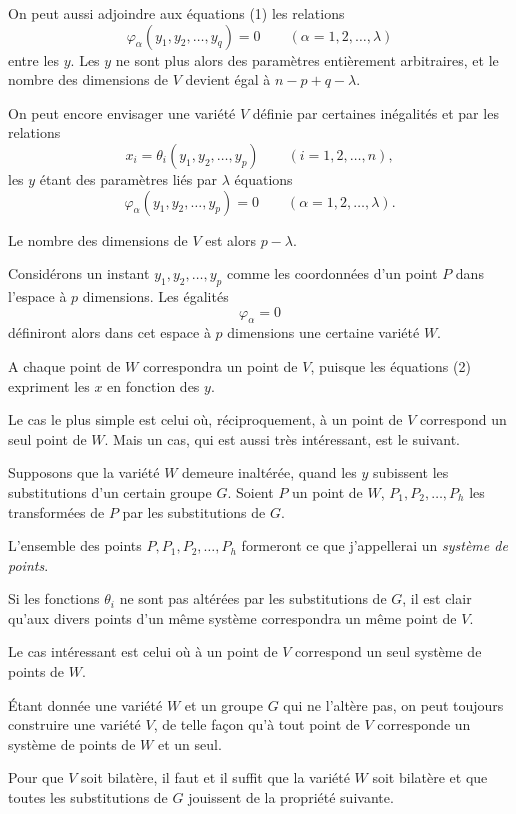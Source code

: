 \documentclass{article}
\begin{document}
On peut aussi adjoindre aux équations (1) les relations
\[ \varphi_{\alpha}(y_{1}, y_{2}, \ldots, y_{q}) = 0 \qquad (\alpha = 1, 2, \ldots, \lambda) \]
entre les $y$. Les $y$ ne sont plus alors des paramètres entièrement arbitraires, et le nombre des dimensions de $V$ devient égal à $n - p + q - \lambda$.

On peut encore envisager une variété $V$ définie par certaines inégalités et par les relations
\[ x_{i} = \theta_{i}(y_{1}, y_{2}, \ldots, y_{p}) \qquad (i = 1, 2, \ldots, n), \tag{2} \]
les $y$ étant des paramètres liés par $\lambda$ équations
\[ \varphi_{\alpha}(y_{1}, y_{2}, \ldots, y_{p}) = 0 \qquad (\alpha = 1, 2, \ldots, \lambda). \]

Le nombre des dimensions de $V$ est alors $p - \lambda$.

Considérons un instant $y_{1}, y_{2}, \ldots, y_{p}$ comme les coordonnées d'un point $P$ dans l'espace à $p$ dimensions. Les égalités
\[ \varphi_{\alpha} = 0 \]
définiront alors dans cet espace à $p$ dimensions une certaine variété $W$.

A chaque point de $W$ correspondra un point de $V$, puisque les équations (2) expriment les $x$ en fonction des $y$.

Le cas le plus simple est celui où, réciproquement, à un point de $V$ correspond un seul point de $W$. Mais un cas, qui est aussi très intéressant, est le suivant.

Supposons que la variété $W$ demeure inaltérée, quand les $y$ subissent les substitutions d'un certain groupe $G$. Soient $P$ un point de $W$, $P_{1}, P_{2}, \ldots, P_{h}$ les transformées de $P$ par les substitutions de $G$.

L'ensemble des points $P, P_{1}, P_{2}, \ldots, P_{h}$ formeront ce que j'appellerai un \emph{système de points}.

Si les fonctions $\theta_{i}$ ne sont pas altérées par les substitutions de $G$, il est clair qu'aux divers points d'un même système correspondra un même point de $V$.

Le cas intéressant est celui où à un point de $V$ correspond un seul système de points de $W$.

Étant donnée une variété $W$ et un groupe $G$ qui ne l'altère pas, on peut toujours construire une variété $V$, de telle façon qu'à tout point de $V$ corresponde un système de points de $W$ et un seul.

Pour que $V$ soit bilatère, il faut et il suffit que la variété $W$ soit bilatère et que toutes les substitutions de $G$ jouissent de la propriété suivante.
\end{document}
